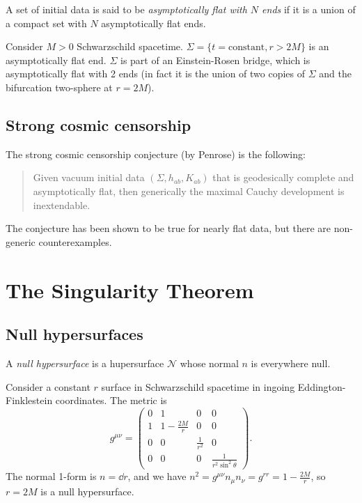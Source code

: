 \documentclass{jknotes}
\begin{document}
\begin{defn}
    A set of initial data is said to be \emph{asymptotically flat with \(N\) ends} if it is a union of a compact set with \(N\) asymptotically flat ends.
\end{defn}

\begin{eg}
    Consider \(M>0\) Schwarzschild spacetime. \(\Sigma = \{t = \text{constant}, r>2M\}\) is an asymptotically flat end. \(\Sigma\) is part of an Einstein-Rosen bridge, which is asymptotically flat with 2 ends (in fact it is the union of two copies of \(\Sigma\) and the bifurcation two-sphere at \(r=2M\)).
\end{eg}

\subsection{Strong cosmic censorship}
The strong cosmic censorship conjecture (by Penrose) is the following:
\begin{quote}
    Given vacuum initial data \((\Sigma,h_{ab},K_{ab})\) that is geodesically complete and asymptotically flat, then  generically the maximal Cauchy development is inextendable.
\end{quote}
The conjecture has been shown to be true for nearly flat data, but there are non-generic counterexamples.

\section{The Singularity Theorem}
\subsection{Null hypersurfaces}
\begin{defn}
    A \emph{null hypersurface} is a hupersurface \(\mathcal{N}\) whose normal \(n\) is everywhere null.
\end{defn}
\begin{eg}
    Consider a constant \(r\) surface in Schwarzschild spacetime in ingoing Eddington-Finklestein coordinates. The metric is
    \begin{equation}
        g^{\mu\nu} = 
        \begin{pmatrix}
            0 & 1 & 0 & 0 \\
            1 & 1 - \frac{2M}{r} & 0 & 0 \\
            0 & 0 & \frac{1}{r^2} & 0 \\
            0 & 0 & 0 & \frac{1}{r^2\sin^2\theta}
        \end{pmatrix}.
    \end{equation}
    The normal 1-form is \(n=\dd{r}\), and we have \(n^2 = g^{\mu\nu}n_\mu n_\nu = g^{rr} = 1 - \frac{2M}{r}\), so \(r=2M\) is a null hypersurface.
\end{eg}
\end{document}
